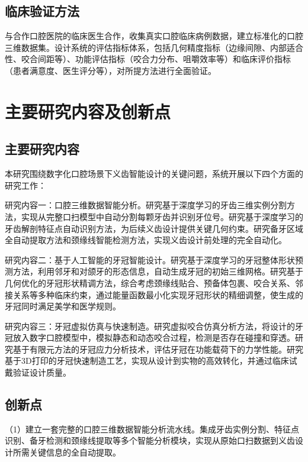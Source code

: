\documentclass[12pt,hyperref,a4paper,UTF8]{ctexart}
\begin{document}
\subsection{临床验证方法}

与合作口腔医院的临床医生合作，收集真实口腔临床病例数据，建立标准化的口腔三维数据集。设计系统的评估指标体系，包括几何精度指标（边缘间隙、内部适合性、咬合间距等）、功能评估指标（咬合力分布、咀嚼效率等）和临床评价指标（患者满意度、医生评分等），对所提方法进行全面验证。

\section{主要研究内容及创新点}

\subsection{主要研究内容}

本研究围绕数字化口腔场景下义齿智能设计的关键问题，系统开展以下四个方面的研究工作：

研究内容一：口腔三维数据智能分析。研究基于深度学习的牙齿三维实例分割方法，实现从完整口扫模型中自动分割每颗牙齿并识别牙位号。研究基于深度学习的牙齿解剖特征点自动识别方法，为后续义齿设计提供关键几何约束。研究备牙区域全自动提取方法和颈缘线智能检测方法，实现义齿设计前处理的完全自动化。

研究内容二：基于人工智能的牙冠智能设计。研究基于深度学习的牙冠整体形状预测方法，利用邻牙和对颌牙的形态信息，自动生成牙冠的初始三维网格。研究基于几何优化的牙冠形状精调方法，综合考虑颈缘线贴合、预备体包裹、咬合关系、邻接关系等多种临床约束，通过能量函数最小化实现牙冠形状的精细调整，使生成的牙冠同时满足美学和医学规则。

研究内容三：牙冠虚拟仿真与快速制造。研究虚拟咬合仿真分析方法，将设计的牙冠放入数字口腔模型中，模拟静态和动态咬合过程，检测是否存在碰撞和穿透。研究基于有限元方法的牙冠应力分析技术，评估牙冠在功能载荷下的力学性能。研究基于3D打印的牙冠快速制造工艺，实现从设计到实物的高效转化，并通过临床试戴验证设计质量。

\subsection{创新点}

（1）建立一套完整的口腔三维数据智能分析流水线。集成牙齿实例分割、特征点识别、备牙检测和颈缘线提取等多个智能分析模块，实现从原始口扫数据到义齿设计所需关键信息的全自动提取。
\end{document}
